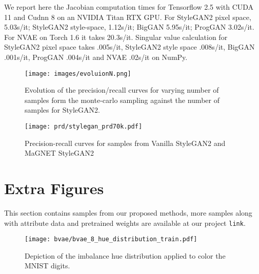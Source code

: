 We report here the Jacobian computation times for Tensorflow 2.5 with CUDA 11 and Cudnn 8 on an NVIDIA Titan RTX GPU. For StyleGAN2 pixel space, 5.03s/it; StyleGAN2 style-space, 1.12s/it; BigGAN 5.95s/it; ProgGAN 3.02s/it. For NVAE on Torch 1.6 it takes 20.3s/it. Singular value calculation for StyleGAN2 pixel space takes .005s/it, StyleGAN2 style space .008s/it, BigGAN .001s/it, ProgGAN .004s/it and NVAE .02s/it on NumPy.

\begin{figure}[t!]
    \centering
    \begin{minipage}{0.39\linewidth}
    \texttt{[image: images/evoluionN.png]}
    \end{minipage}
    \begin{minipage}{0.49\linewidth}
    \caption{Evolution of the precision/recall curves for varying number of samples  form the monte-carlo sampling against the number of samples  for StyleGAN2.}
    \label{fig:evoluion}
    \end{minipage}
\end{figure}

\begin{figure}[h]
    \centering
    \begin{minipage}{0.39\linewidth}
    \texttt{[image: prd/stylegan\_prd70k.pdf]}
    \end{minipage}
    \begin{minipage}{0.49\linewidth}
    \caption{Precision-recall curves for  samples from Vanilla StyleGAN2 and MaGNET StyleGAN2}
    \label{fig:styleganpr}
    \end{minipage}
\end{figure}


\section{Extra Figures}
\label{appendix:figures}





This section contains samples from our proposed methods, more samples along with attribute data and pretrained weights are available at our project \texttt{link}.


\begin{figure}[t!]
    \centering
    \begin{minipage}{0.39\linewidth}
    \texttt{[image: bvae/bvae\_8\_hue\_distribution\_train.pdf]}
    \end{minipage}
    \begin{minipage}{0.49\linewidth}
    \caption{Depiction of the imbalance hue distribution applied to color the MNIST digits.}
    \label{fig:hue_original}
    \end{minipage}
\end{figure}


